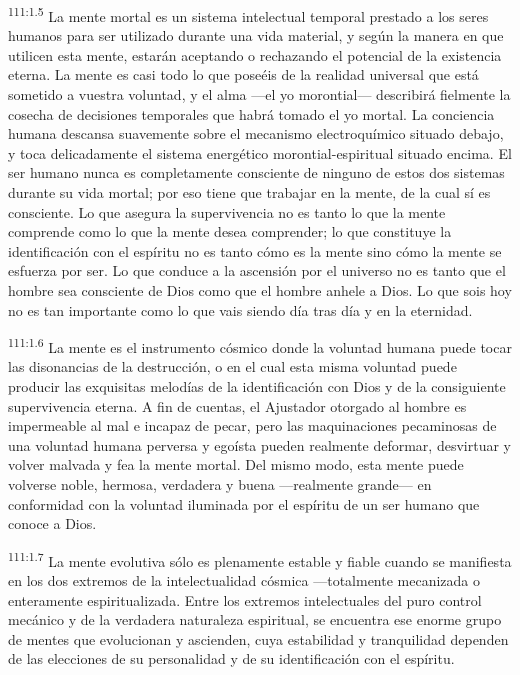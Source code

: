 \par
\textsuperscript{111:1.5} La mente mortal es un sistema intelectual temporal prestado a los seres humanos para ser utilizado durante una vida material, y según la manera en que utilicen esta mente, estarán aceptando o rechazando el potencial de la existencia eterna. La mente es casi todo lo que poseéis de la realidad universal que está sometido a vuestra voluntad, y el alma ---el yo morontial--- describirá fielmente la cosecha de decisiones temporales que habrá tomado el yo mortal. La conciencia humana descansa suavemente sobre el mecanismo electroquímico situado debajo, y toca delicadamente el sistema energético morontial-espiritual situado encima. El ser humano nunca es completamente consciente de ninguno de estos dos sistemas durante su vida mortal; por eso tiene que trabajar en la mente, de la cual sí es consciente. Lo que asegura la supervivencia no es tanto lo que la mente comprende como lo que la mente desea comprender; lo que constituye la identificación con el espíritu no es tanto cómo es la mente sino cómo la mente se esfuerza por ser. Lo que conduce a la ascensión por el universo no es tanto que el hombre sea consciente de Dios como que el hombre anhele a Dios. Lo que sois hoy no es tan importante como lo que vais siendo día tras día y en la eternidad.

\par
\textsuperscript{111:1.6} La mente es el instrumento cósmico donde la voluntad humana puede tocar las disonancias de la destrucción, o en el cual esta misma voluntad puede producir las exquisitas melodías de la identificación con Dios y de la consiguiente supervivencia eterna. A fin de cuentas, el Ajustador otorgado al hombre es impermeable al mal e incapaz de pecar, pero las maquinaciones pecaminosas de una voluntad humana perversa y egoísta pueden realmente deformar, desvirtuar y volver malvada y fea la mente mortal. Del mismo modo, esta mente puede volverse noble, hermosa, verdadera y buena ---realmente grande--- en conformidad con la voluntad iluminada por el espíritu de un ser humano que conoce a Dios.

\par
\textsuperscript{111:1.7} La mente evolutiva sólo es plenamente estable y fiable cuando se manifiesta en los dos extremos de la intelectualidad cósmica ---totalmente mecanizada o enteramente espiritualizada. Entre los extremos intelectuales del puro control mecánico y de la verdadera naturaleza espiritual, se encuentra ese enorme grupo de mentes que evolucionan y ascienden, cuya estabilidad y tranquilidad dependen de las elecciones de su personalidad y de su identificación con el espíritu.

